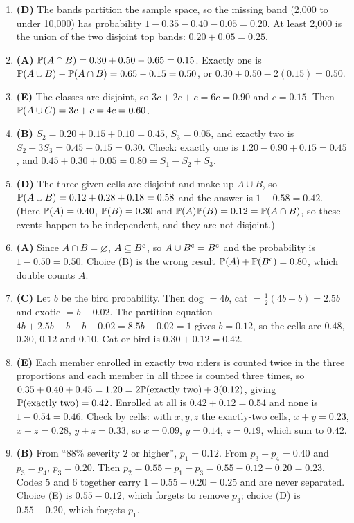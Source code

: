 \begin{enumerate}[label=\arabic*.,nosep]
\item \textbf{(D)} The bands partition the sample space, so the missing band (2{,}000 to under
      10{,}000) has probability $1 - 0.35 - 0.40 - 0.05 = 0.20$. At least 2{,}000 is the union
      of the two disjoint top bands: $0.20 + 0.05 = 0.25$.
\item \textbf{(A)} $\mathbb{P}(A \cap B) = 0.30 + 0.50 - 0.65 = 0.15$. Exactly one is
      $\mathbb{P}(A \cup B) - \mathbb{P}(A \cap B) = 0.65 - 0.15 = 0.50$, or
      $0.30 + 0.50 - 2(0.15) = 0.50$.
\item \textbf{(E)} The classes are disjoint, so $3c + 2c + c = 6c = 0.90$ and $c = 0.15$.
      Then $\mathbb{P}(A \cup C) = 3c + c = 4c = 0.60$.
\item \textbf{(B)} $S_2 = 0.20 + 0.15 + 0.10 = 0.45$, $S_3 = 0.05$, and exactly two is
      $S_2 - 3S_3 = 0.45 - 0.15 = 0.30$. Check: exactly one is
      $1.20 - 0.90 + 0.15 = 0.45$, and $0.45 + 0.30 + 0.05 = 0.80 = S_1 - S_2 + S_3$.
\item \textbf{(D)} The three given cells are disjoint and make up $A \cup B$, so
      $\mathbb{P}(A \cup B) = 0.12 + 0.28 + 0.18 = 0.58$ and the answer is $1 - 0.58 = 0.42$.
      (Here $\mathbb{P}(A) = 0.40$, $\mathbb{P}(B) = 0.30$ and $\mathbb{P}(A)\mathbb{P}(B) = 0.12 = \mathbb{P}(A \cap B)$,
      so these events happen to be independent, and they are not disjoint.)
\item \textbf{(A)} Since $A \cap B = \varnothing$, $A \subseteq B^{\mathrm{c}}$, so
      $A \cup B^{\mathrm{c}} = B^{\mathrm{c}}$ and the probability is $1 - 0.50 = 0.50$. Choice (B) is
      the wrong result $\mathbb{P}(A) + \mathbb{P}(B^{\mathrm{c}}) = 0.80$, which double counts $A$.
\item \textbf{(C)} Let $b$ be the bird probability. Then dog $= 4b$, cat
      $= \tfrac12(4b + b) = 2.5b$ and exotic $= b - 0.02$. The partition equation
      $4b + 2.5b + b + b - 0.02 = 8.5b - 0.02 = 1$ gives $b = 0.12$, so the cells are
      $0.48$, $0.30$, $0.12$ and $0.10$. Cat or bird is $0.30 + 0.12 = 0.42$.
\item \textbf{(E)} Each member enrolled in exactly two riders is counted twice in the
      three proportions and each member in all three is counted three times, so
      $0.35 + 0.40 + 0.45 = 1.20 = 2\mathbb{P}(\text{exactly two}) + 3(0.12)$, giving
      $\mathbb{P}(\text{exactly two}) = 0.42$. Enrolled at all is $0.42 + 0.12 = 0.54$ and none
      is $1 - 0.54 = 0.46$. Check by cells: with $x, y, z$ the exactly-two cells,
      $x + y = 0.23$, $x + z = 0.28$, $y + z = 0.33$, so $x = 0.09$, $y = 0.14$,
      $z = 0.19$, which sum to $0.42$.
\item \textbf{(B)} From ``$88\%$ severity $2$ or higher'', $p_1 = 0.12$. From
      $p_3 + p_4 = 0.40$ and $p_3 = p_4$, $p_3 = 0.20$. Then
      $p_2 = 0.55 - p_1 - p_3 = 0.55 - 0.12 - 0.20 = 0.23$. Codes $5$ and $6$ together
      carry $1 - 0.55 - 0.20 = 0.25$ and are never separated. Choice (E) is
      $0.55 - 0.12$, which forgets to remove $p_3$; choice (D) is $0.55 - 0.20$, which
      forgets $p_1$.
\end{enumerate}

